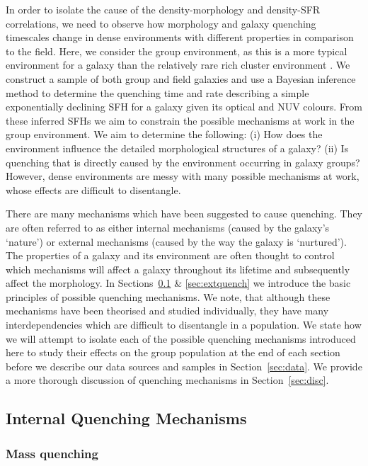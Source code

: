 \documentclass[useAMS,usenatbib]{mn2e}
\def\minor		{\color{minorcol}}
\begin{document}
In order to isolate the cause of the density-morphology and density-SFR correlations, we need to observe how morphology and galaxy quenching timescales change in dense environments with different properties in comparison to the field. Here, we consider the group environment, as this is a more typical environment for a galaxy than the relatively rare rich cluster environment \citep{carlberg04}. We construct a sample of both group and field galaxies and use a Bayesian inference method to determine the quenching time and rate describing a simple exponentially declining SFH for a galaxy given its optical and NUV colours. From these inferred SFHs we aim to constrain the possible mechanisms at work in the group environment. We aim to determine the following: (i) How does the environment influence the detailed morphological structures of a galaxy?  (ii) Is quenching that is directly caused by the environment occurring in galaxy groups? However, dense environments are messy with many possible mechanisms at work, whose effects are difficult to disentangle. 

There are many mechanisms which have been suggested to cause quenching. They are often referred to as either internal mechanisms (caused by the galaxy's `nature') or external mechanisms (caused by the way the galaxy is `nurtured'). The properties of a galaxy and its environment are often thought to control which mechanisms will affect a galaxy throughout its lifetime and subsequently affect the morphology. {\minor In Sections~\ref{sec:intquench} \& \ref{sec:extquench} we introduce the basic principles of possible quenching mechanisms. We note, that although these mechanisms have been theorised and studied individually, they have many interdependencies which are difficult to disentangle in a population. We state how we will attempt to isolate each of the possible quenching mechanisms introduced here to study their effects on the group population at the end of each section} before we describe our data sources and samples in Section~\ref{sec:data}. We provide a more thorough discussion of quenching mechanisms in Section~\ref{sec:disc}.


\subsection{Internal Quenching Mechanisms}\label{sec:intquench}

\subsubsection{Mass quenching}\label{sec:massquench}
\end{document}
